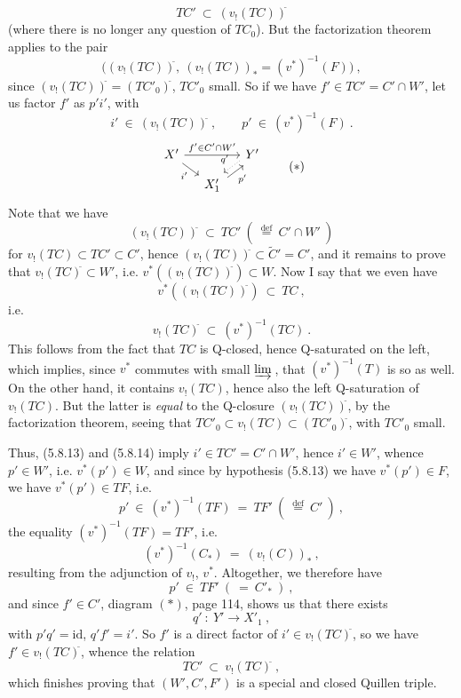 \documentclass[11pt]{article}
\newcommand{\printedpage}[1]{\marginpar{\footnotesize p.~#1}}
\newcommand{\msp}[1]{\marginpar{\footnotesize [#1]}}
\newcommand{\cl}{^{\tilde{}}}%
\newcommand{\defeq}{\overset{\text{def}}{=}}
\begin{document}
\[
TC' \ \subset \ (v_!(TC))\cl
\tag*{(5.8.12 bis)}
\]
(where there is no longer any question of $TC_0$). But the factorization theorem applies to the pair
\[
\Big( (v_!(TC))\cl,\ (v_!(TC))_* = (v^*)^{-1}(F) \Big)\ ,
\]
since $(v_!(TC))\cl = (TC'_0)\cl$, $TC'_0$ small. So if we have $f' \in TC' = C' \cap W'$, let us factor $f'$ as $p'i'$, with
\[
i' \ \in \ (v_!(TC))\cl\ , \qquad p' \ \in \ (v^*)^{-1}(F)\ .
\tag*{(5.8.13)}
\]
\[
\begin{tikzcd}[column sep=small, row sep=small]
X' \arrow[rr, "f' \in C' \cap W'"] \arrow[dr, "i'"'] & & Y' \arrow[dl, dotted, shift right, "q'"'] \\
& X'_1 \arrow[ur, shift right, "p'"'] &
\end{tikzcd}
\tag*{$(*)$}
\]
Note that we have
\msp{page 95}
\[
(v_!(TC))\cl \ \subset \ TC' \ (\ \defeq \ C' \cap W'\ )
\tag*{(5.8.14)}
\]
for $v_!(TC) \subset TC' \subset C'$, hence $(v_!(TC))\cl \subset \tilde{C}' = C'$, and it remains to prove that $v_!(TC)\cl \subset W'$, i.e. $v^*((v_!(TC))\cl) \subset W$. Now I say that we even have
\[
v^*((v_!(TC))\cl) \ \subset \ TC\ ,
\]
i.e.
\[
v_!(TC)\cl \ \subset \ (v^*)^{-1}(TC)\ .
\tag*{(5.8.15)}
\]
This follows from the fact that $TC$ is Q-closed, hence Q-saturated on the left, which implies, since $v^*$ commutes with small $\varinjlim$\,, that $(v^*)^{-1}(T)$ is so as well. On the other hand, it contains $v_!(TC)$, hence also the left Q-saturation of $v_!(TC)$. But the latter is \textit{equal} to the Q-closure $(v_!(TC))\cl$, by the factorization theorem, seeing that $TC'_0 \subset v_!(TC) \subset (TC'_0)\cl$, with $TC'_0$ small. %

Thus, (5.8.13) and (5.8.14) imply $i' \in TC' = C' \cap W'$, hence $i' \in W'$, whence $p' \in W'$, i.e. $v^*(p') \in W$, and since by hypothesis
\printedpage{48}
\msp{page 96}
(5.8.13) we have $v^*(p') \in F$, we have $v^*(p') \in TF$, i.e.
\[
p' \ \in \ (v^*)^{-1}(TF) \ = \ TF' \ (\ \defeq \ C'\ )\ , %
\]
the equality $(v^*)^{-1}(TF) = TF'$, i.e.
\[
(v^*)^{-1}(C_*) \ = \ (v_!(C))_*\ ,
\]
resulting from the adjunction of $v_!$, $v^*$. Altogether, we therefore have
\[
p' \ \in \ TF' \ (\ = \ C'_*\ )\ ,
\tag*{(5.8.16)}
\]
and since $f' \in C'$, diagram $(*)$, page 114, shows us that there exists
\[
q' \ : \ Y' \longrightarrow X'_1\ ,
\]
with $p'q' = \mathrm{id}$, $q'f' = i'$. So $f'$ is a direct factor of $i' \in v_!(TC)\cl$, so we have $f' \in v_!(TC)\cl$, whence the relation
\[
TC' \ \subset \ v_!(TC)\cl\ ,
\]
which finishes proving that $(W', C', F')$ is a special and closed Quillen triple.
\end{document}
